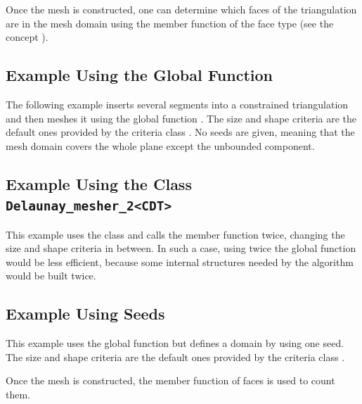 Once the mesh is constructed, one can determine which faces of the
triangulation are in the mesh domain using the  member
function of the face type (see the concept ).

\subsection{Example Using the Global Function}

The following example inserts several segments into a constrained
triangulation and then meshes it using the global function
. The size and shape criteria are the default ones
provided by the criteria class . No seeds are
given, meaning that the mesh domain covers the whole plane except the
unbounded component.


\subsection{Example Using the Class \texttt{Delaunay\_mesher\_2<CDT>}}

This example uses the class  and calls
  the  member function twice, changing the size and
  shape criteria in between. In such a case, using twice the global
  function  would be less efficient,
  because some internal structures needed by the algorithm would be
  built twice.


\subsection{Example Using Seeds}

This example uses the global function  but
defines a domain by using one seed. The size and shape criteria are the
default ones provided by the criteria class
.

Once the mesh is constructed, the  member function of
faces is used to count them.


